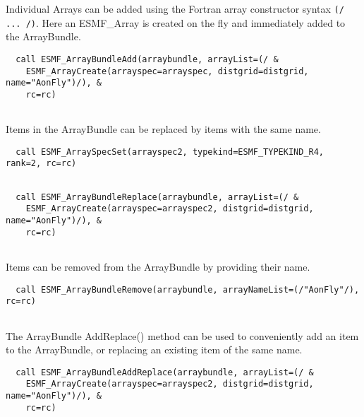    Individual Arrays can be added using the Fortran array constructor syntax
   {\tt (/ ... /)}. Here an ESMF\_Array is created on the fly and immediately
   added to the ArrayBundle. 

 \begin{verbatim}
  call ESMF_ArrayBundleAdd(arraybundle, arrayList=(/ &
    ESMF_ArrayCreate(arrayspec=arrayspec, distgrid=distgrid, name="AonFly")/), &
    rc=rc)
 
\end{verbatim}
 

   Items in the ArrayBundle can be replaced by items with the same name. 

 \begin{verbatim}
  call ESMF_ArraySpecSet(arrayspec2, typekind=ESMF_TYPEKIND_R4, rank=2, rc=rc)
 
\end{verbatim}
 

 \begin{verbatim}
  call ESMF_ArrayBundleReplace(arraybundle, arrayList=(/ &
    ESMF_ArrayCreate(arrayspec=arrayspec2, distgrid=distgrid, name="AonFly")/), &
    rc=rc)
 
\end{verbatim}
 

   Items can be removed from the ArrayBundle by providing their name. 

 \begin{verbatim}
  call ESMF_ArrayBundleRemove(arraybundle, arrayNameList=(/"AonFly"/), rc=rc)
 
\end{verbatim}
 

   The ArrayBundle AddReplace() method can be used to conveniently add an
   item to the ArrayBundle, or replacing an existing item of the same name. 

 \begin{verbatim}
  call ESMF_ArrayBundleAddReplace(arraybundle, arrayList=(/ &
    ESMF_ArrayCreate(arrayspec=arrayspec2, distgrid=distgrid, name="AonFly")/), &
    rc=rc)
 
\end{verbatim}
 
